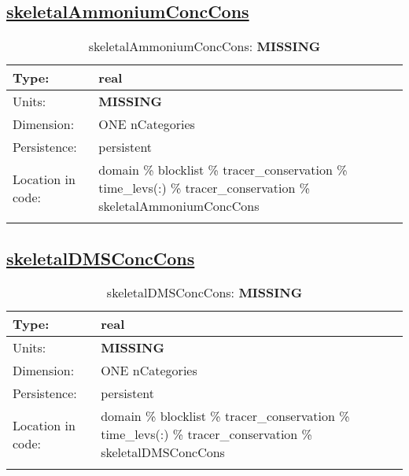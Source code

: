 \subsection[skeletalAmmoniumConcCons]{\hyperref[sec:var_tab_tracer_conservation]{skeletalAmmoniumConcCons}}
\label{subsec:var_sec_tracer_conservation_skeletalAmmoniumConcCons}
\begin{center}
\begin{longtable}{| p{2.0in} | p{4.0in} |}
        \hline 
        Type: & real \\
        \hline 
        Units: & {\bf \color{red} MISSING} \\
        \hline 
        Dimension: & ONE nCategories \\
        \hline 
        Persistence: & persistent \\
        \hline 
         Location in code: & domain \% blocklist \% tracer\_conservation \% time\_levs(:) \% tracer\_conservation \% skeletalAmmoniumConcCons \\
         \hline 
    \caption{skeletalAmmoniumConcCons: {\bf \color{red} MISSING}}
\end{longtable}
\end{center}
\subsection[skeletalDMSConcCons]{\hyperref[sec:var_tab_tracer_conservation]{skeletalDMSConcCons}}
\label{subsec:var_sec_tracer_conservation_skeletalDMSConcCons}
\begin{center}
\begin{longtable}{| p{2.0in} | p{4.0in} |}
        \hline 
        Type: & real \\
        \hline 
        Units: & {\bf \color{red} MISSING} \\
        \hline 
        Dimension: & ONE nCategories \\
        \hline 
        Persistence: & persistent \\
        \hline 
         Location in code: & domain \% blocklist \% tracer\_conservation \% time\_levs(:) \% tracer\_conservation \% skeletalDMSConcCons \\
         \hline 
    \caption{skeletalDMSConcCons: {\bf \color{red} MISSING}}
\end{longtable}
\end{center}
